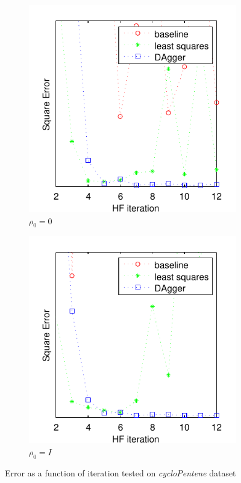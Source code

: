 \documentclass[twoside,11pt]{article}
\begin{document}
\begin{figure}[h!]
\centering
\begin{subfigure}{.5\textwidth}
  \centering
  \includegraphics[scale=0.7]{cycloPen_pzero_test_12iter.pdf}
  \caption{$\rho_0 = 0$}
  \label{fig:cycloPen0}
\end{subfigure}%
\begin{subfigure}{.5\textwidth}
  \centering
  \includegraphics[scale=0.7]{cycloPen_peye_test_12iter.pdf}
  \caption{$\rho_0 = I$}
  \label{fig:cycloPenI}
\end{subfigure}
\caption{Error as a function of iteration tested on \textit{cycloPentene} dataset}
\label{fig:testcycloPen}
\end{figure}
\end{document}
